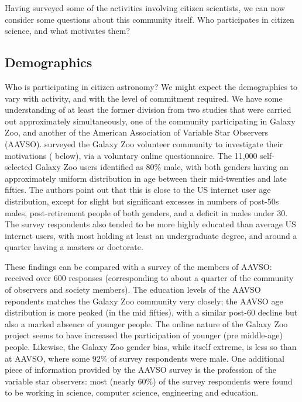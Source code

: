 \documentclass{ar2e}
\begin{document}
Having surveyed some of the activities involving citizen scientists, we can
now consider some questions about this community itself. Who participates in
citizen science, and what motivates them?



\subsection{Demographics}
\label{sec:crowd:demographics}

Who is participating in citizen astronomy? We might expect the demographics to
vary with activity, and with the level of commitment required. We have some
understanding of at least the former division from two studies that were
carried out approximately simultaneously, one of the community  participating
in Galaxy Zoo, and another of the  American Association of Variable Star
Observers (AAVSO).  \citet{Rad++13} surveyed the Galaxy Zoo volunteer
community to investigate their motivations (
below), via a voluntary online questionnaire. The 11,000 self-selected Galaxy
Zoo users identified as 80\% male, with both genders having an approximately
uniform distribution in age between their mid-twenties and late fifties. The
authors point out that this is close to the US internet user age distribution,
except for slight but significant excesses in numbers of post-50s males,
post-retirement people of both genders, and a deficit in males under 30. The
survey respondents  also tended to be more highly educated than average US
internet users, with most holding at least an undergraduate degree, and around
a quarter having a masters or doctorate. 

These findings can be compared with a survey of the members of AAVSO:
\citet{P+P2012} received over 600 responses  (corresponding to about a quarter
of the community of observers and society members). The education levels of
the AAVSO repondents matches the Galaxy Zoo community very closely; the AAVSO
age distribution is more peaked (in the mid fifties), with a similar post-60
decline but also a marked absence of younger people. The online nature of the
Galaxy Zoo project seems to have increased the participation of younger (pre
middle-age) people. Likewise, the Galaxy Zoo gender bias, while itself
extreme, is less so than at AAVSO, where some 92\% of survey respondents were
male. One additional piece of information provided by the AAVSO survey is the
profession of the variable star observers: most (nearly 60\%) of the survey
respondents were found to be working in science, computer science, engineering
and education.
\end{document}
